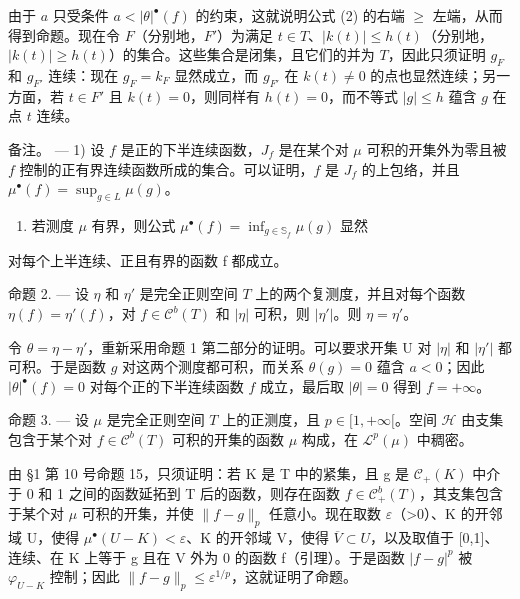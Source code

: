 由于 \(a\) 只受条件 \(a < |\theta|^{\bullet}(f)\) 的约束，这就说明公式 (2) 的右端 \(\geqslant\) 左端，从而得到命题。现在令 \(F\)（分别地，\(F'\)）为满足 \(t \in T\)、\(|k(t)| \leqslant h(t)\)（分别地，\(|k(t)| \geqslant h(t)\)）的集合。这些集合是闭集，且它们的并为 \(T\)，因此只须证明 \(g_{F}\) 和 \(g_{F'}\) 连续：现在 \(g_{F} = k_{F}\) 显然成立，而 \(g_{F'}\) 在 \(k(t) \neq 0\) 的点也显然连续；另一方面，若 \(t \in F'\) 且 \(k(t) = 0\)，则同样有 \(h(t) = 0\)，而不等式 \(|g| \leqslant h\) 蕴含 \(g\) 在点 \(t\) 连续。

备注。 --- 1) 设 \(f\) 是正的下半连续函数，\(J_f\) 是在某个对 \(\mu\) 可积的开集外为零且被 \(f\) 控制的正有界连续函数所成的集合。可以证明，\(f\) 是 \(J_f\) 的上包络，并且 \(\mu^\bullet(f) = \sup_{g \in L} \mu(g)\)。

\begin{enumerate}
\def\labelenumi{\arabic{enumi})}
\setcounter{enumi}{1}
\tightlist
\item
  若测度 \(\mu\) 有界，则公式 \(\mu^{\bullet}(f) = \inf_{g\in \mathbb{S}_f}\mu (g)\) 显然
\end{enumerate}

对每个上半连续、正且有界的函数 f 都成立。

命题 2. --- 设 \(\eta\) 和 \(\eta'\) 是完全正则空间 \(T\) 上的两个复测度，并且对每个函数 \(\eta(f) = \eta'(f)\)，对 \(f \in \mathcal{C}^b(T)\) 和 \(|\eta|\) 可积，则 \(|\eta'|\)。则 \(\eta = \eta'\)。

令 \(\theta = \eta - \eta'\)，重新采用命题 1 第二部分的证明。可以要求开集 U 对 \(|\eta|\) 和 \(|\eta'|\) 都可积。于是函数 \(g\) 对这两个测度都可积，而关系 \(\theta(g) = 0\) 蕴含 \(a < 0\)；因此 \(|\theta|^{\bullet}(f) = 0\) 对每个正的下半连续函数 \(f\) 成立，最后取 \(|\theta| = 0\) 得到 \(f = +\infty\)。

命题 3. --- 设 \(\mu\) 是完全正则空间 \(T\) 上的正测度，且 \(p \in [1, +\infty[\)。空间 \(\mathcal{H}\) 由支集包含于某个对 \(f \in \mathcal{C}^b(T)\) 可积的开集的函数 \(\mu\) 构成，在 \(\mathcal{L}^p(\mu)\) 中稠密。

由 §1 第 10 号命题 15，只须证明：若 K 是 T 中的紧集，且 g 是 \(\mathcal{C}_{+}(K)\) 中介于 0 和 1 之间的函数延拓到 T 后的函数，则存在函数 \(f \in \mathcal{C}_{+}^{b}(T)\)，其支集包含于某个对 \(\mu\) 可积的开集，并使 \(\|f - g\|_{p}\) 任意小。现在取数 \(\varepsilon\)（\textgreater0）、K 的开邻域 U，使得 \(\mu^{\bullet}(U - K) < \varepsilon\)、K 的开邻域 V，使得 \(\overline{V} \subset U\)，以及取值于 {[}0,1{]}、连续、在 K 上等于 g 且在 V 外为 0 的函数 f（引理）。于是函数 \(|f - g|^{p}\) 被 \(\varphi_{U-K}\) 控制；因此 \(\|f - g\|_{p} \leqslant \varepsilon^{1/p}\)，这就证明了命题。

